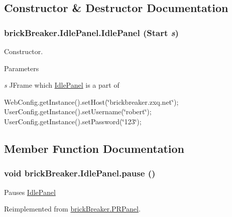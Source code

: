 \subsection{Constructor \& Destructor Documentation}
\hypertarget{classbrick_breaker_1_1_idle_panel_ab4ba4ca56923da71a415ca965a07b0dd}{
\subsubsection[{IdlePanel}]{\setlength{\rightskip}{0pt plus 5cm}brickBreaker.IdlePanel.IdlePanel ({\bf Start} {\em s})}}
\label{classbrick_breaker_1_1_idle_panel_ab4ba4ca56923da71a415ca965a07b0dd}
Constructor.


\begin{DoxyParams}{Parameters}
\item[{\em s}]JFrame which \hyperlink{classbrick_breaker_1_1_idle_panel}{IdlePanel} is a part of \end{DoxyParams}


WebConfig.getInstance().setHost(\char`\"{}brickbreaker.zxq.net\char`\"{}); UserConfig.getInstance().setUsername(\char`\"{}robert\char`\"{}); UserConfig.getInstance().setPassword(\char`\"{}123\char`\"{});



\subsection{Member Function Documentation}
\hypertarget{classbrick_breaker_1_1_idle_panel_a42b96627662408932245a672b5fbfaf1}{
\subsubsection[{pause}]{\setlength{\rightskip}{0pt plus 5cm}void brickBreaker.IdlePanel.pause ()}}
\label{classbrick_breaker_1_1_idle_panel_a42b96627662408932245a672b5fbfaf1}
Pauses \hyperlink{classbrick_breaker_1_1_idle_panel}{IdlePanel} 

Reimplemented from \hyperlink{classbrick_breaker_1_1_p_r_panel}{brickBreaker.PRPanel}.

